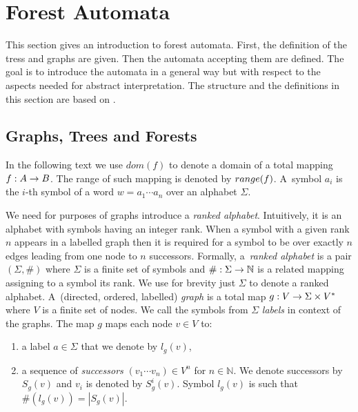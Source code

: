 \documentclass[a4paper, 12pt]{article}
\begin{document}
\section{Forest Automata}
\label{sec:fa}

This section gives an introduction to forest automata.
First, the definition of the tress and graphs are given.
Then the automata accepting them are defined.
The goal is to introduce the automata in a general way
but with respect to the aspects needed for abstract interpretation.
The structure and the definitions in this section are based on \cite{mt:hruska}.

\subsection{Graphs, Trees and Forests}
\label{sec:graph}

In the following text we use $dom(f)$ to denote a domain of a total mapping $f: A \rightarrow B$.
The range of such mapping is denoted by $range(f)$.
A~symbol $a_i$ is the $i$-th symbol of a word $w = a_1 \cdots a_n$ over an alphabet $\Sigma$.

We need for purposes of graphs introduce a \emph{ranked alphabet}.
Intuitively, it is an alphabet with symbols having an integer rank.
When a symbol with a given rank $n$ appears in a labelled graph
then it is required for a symbol to be over exactly $n$ edges
leading from one node to $n$ successors.
Formally, a~\emph{ranked alphabet} is a pair $(\Sigma, \#)$ where $\Sigma$ is
a finite set of symbols and $\#: \Sigma \rightarrow \mathbb{N}$ is a related mapping
assigning to a symbol its rank.
We use for brevity just $\Sigma$ to denote a ranked alphabet.
A~(directed, ordered, labelled) \emph{graph} is a total map $g: V \rightarrow \Sigma \times V^{*}$ where $V$ is a finite set of nodes.
We call the symbols from $\Sigma$ \emph{labels} in context of the graphs.
The map $g$ maps each node $v\in V$ to:
\begin{enumerate}
	\item a label $a \in \Sigma$ that we denote by $l_g(v)$,
	\item a sequence of \emph{successors} $(v_1 \cdots v_n) \in V^n$ for $n \in \mathbb{N}$.
		We denote successors by $S_g(v)$ and $v_i$ is denoted by $S^i_g(v)$.
	    Symbol $l_g(v)$ is such that $\#(l_g(v)) = |S_g(v)|$.
\end{enumerate}
\end{document}
